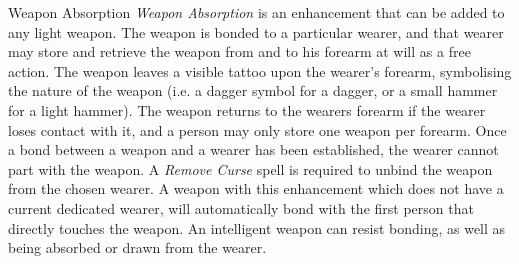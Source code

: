 \begin{35e}{Weapon Absorption}
  \emph{Weapon Absorption} is an enhancement that can be added to any light
  weapon. The weapon is bonded to a particular wearer, and that wearer may
  store and retrieve the weapon from and to his forearm at will as a free
  action. The weapon leaves a visible tattoo upon the wearer's forearm,
  symbolising the nature of the weapon (i.e. a dagger symbol for a dagger, or
  a small hammer for a light hammer). The weapon returns to the wearers
  forearm if the wearer loses contact with it, and a person may only store one
  weapon per forearm. Once a bond between a weapon and a wearer has been
  established, the wearer cannot part with the weapon. A \emph{Remove Curse}
  spell is required to unbind the weapon from the chosen wearer. A weapon
  with this enhancement which does not have a current dedicated wearer, will
  automatically bond with the first person that directly touches the weapon.
  An intelligent weapon can resist bonding, as well as being absorbed or drawn
  from the wearer.
\end{35e}

